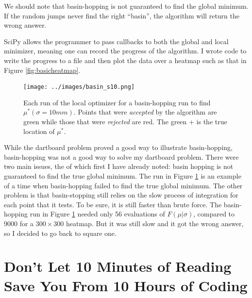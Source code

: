 \documentclass[]{article}
\newcommand{\mustar}{\ensuremath{\mu^* }}
\begin{document}
We should note that basin-hopping is not guaranteed to find the global minimum. If the random jumps never find the right ``basin'', the algorithm will return the wrong answer.

SciPy allows the programmer to pass callbacks to both the global and local minimizer, meaning one can record the progress of the algorithm. I wrote code to write the progress to a file and then plot the data over a heatmap such as that in Figure \ref{fig:basicheatmap}.
\begin{figure}[h!]
	\centering
	\texttt{[image: ../images/basin\_s10.png]}
	\caption{Each run of the local optimizer for a basin-hopping run to find $\mustar(\sigma=10mm)$.  Points that were \textit{accepted} by the algorithm are green while those that were \textit{rejected} are red. The green + is the true location of \mustar.}
	\label{fig:basin}
\end{figure}

While the dartboard problem proved a good way to illustrate basin-hopping, basin-hopping was not a good way to solve my dartboard problem. There were two main issues, the of which first I have already noted: basin hopping is not guaranteed to find the true global minimum. The run in Figure \ref{fig:basin} is an example of a time when basin-hopping failed to find the true global minimum. The other problem is that basin-stopping still relies on the slow process of integration for each point that it tests. To be sure, it is still faster than brute force. The basin-hopping run in Figure \ref{fig:basin} needed only 56 evaluations of $F(\mu \vert \sigma)$, compared to 9000 for a $300 \times 300$ heatmap. But it was still slow and it got the wrong answer, so I decided to go back to square one.

\section{Don't Let 10 Minutes of Reading Save You From 10 Hours of Coding}










	

\printbibliography
\end{document}
